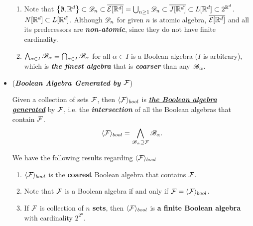 \documentclass[11pt]{article}
\begin{document}
\begin{itemize}
\begin{example}
\begin{enumerate}
\item Note that $\left\{\emptyset,{\mathbb R}^{d}\right\}\subset {\mathscr D}_{n}\subset \overline{{\mathcal E}[{\mathbb R}^{d}]} = \bigcup_{n\ge 1}{\mathscr D}_{n} \subset \overline{J[{\mathbb R}^{d}]} \subset L[{\mathbb R}^{d}]  \subset 2^{{\mathbb R}^{d}}$. $N[{\mathbb R}^{d}]\subset L[{\mathbb R}^{d}]$. Although ${\mathscr D}_{n}$ for given $n$ is atomic algebra, $\overline{{\mathcal E}[{\mathbb R}^{d}]}$ and all its predecessors are \emph{\textbf{non-atomic}}, since they do not have finite cardinality. 

\item $\bigwedge_{\alpha\in I}{\mathscr B}_{\alpha}\equiv \bigcap_{\alpha\in I}{\mathscr B}_{\alpha}$ for all $\alpha\in I$ is a Boolean algebra ($I$ is arbitrary), which is \emph{\textbf{the finest algebra}} that is \emph{\textbf{coarser}} than any ${\mathscr B}_{\alpha}$.  
\end{enumerate}
\end{example}

\item \begin{example} (\emph{\textbf{Boolean Algebra Generated by ${\mathcal F}$}})
\begin{definition}
Given a collection of sets ${\mathcal F}$, then $\langle {\mathcal F} \rangle_{bool}$ is \underline{\emph{\textbf{the Boolean algebra generated}}} by ${\mathcal F}$, i.e. the \emph{\textbf{intersection}} of all the Boolean algebras that contain ${\mathcal F}$. 
\begin{align*}
\langle {\mathcal F} \rangle_{bool} = \bigwedge_{{\mathscr B}_{\alpha} \supseteq {\mathcal F}}{\mathscr B}_{\alpha}.
\end{align*} 
\end{definition}

\begin{proposition}
We have the following results regarding $\langle {\mathcal F} \rangle_{bool}$
\begin{enumerate}
\item $\langle {\mathcal F} \rangle_{bool}$ is the \textbf{coarest} Boolean algebra that contains ${\mathcal F}$.
\item Note that ${\mathcal F}$ is a Boolean algebra if and only if ${\mathcal F} = \langle {\mathcal F} \rangle_{bool}$.
\item If ${\mathcal F}$ is collection of \textbf{$n$ sets}, then $\langle {\mathcal F} \rangle_{bool}$ is \textbf{a finite Boolean algebra} with cardinality $2^{2^{n}}$.
\end{enumerate}
\end{proposition}


\end{example}
\end{itemize}
\end{document}
